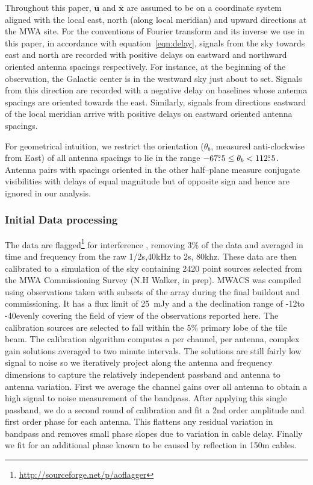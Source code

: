\documentclass[preprint2,iop,numberedappendix]{emulateapj}
\begin{document}
Throughout this paper, $\overline{\mathbf{u}}$ and $\overline{\mathbf{x}}$ are assumed to be on a coordinate system aligned with the local east, north (along local meridian) and upward directions at the MWA site. For the conventions of Fourier transform and its inverse we use in this paper, in accordance with equation~\ref{eqn:delay}, signals from the sky towards east and north are recorded with positive delays on eastward and northward oriented antenna spacings respectively. For instance, at the beginning of the observation, the Galactic center is in the westward sky just about to set. Signals from this direction are recorded with a negative delay on baselines whose antenna spacings are oriented towards the east. Similarly, signals from directions eastward of the local meridian arrive with positive delays on eastward oriented antenna spacings. 

For geometrical intuition, we restrict the orientation ($\theta_b$, measured anti-clockwise from East) of all antenna spacings to lie in the range $-67\mbox{$.\!\!^\circ$} 5 \leq \theta_b < 112\mbox{$.\!\!^\circ$} 5$. Antenna pairs with spacings oriented in the other half--plane measure conjugate visibilities with delays of equal magnitude but of opposite sign and hence are ignored in our analysis.


\subsubsection{Initial Data processing}\label{sec:data-analysis}
The data are flagged\footnote{\url{http://sourceforge.net/p/aoflagger}} for interference \citep{off12,off10}, removing 3\% of the data and averaged in time  and frequency from the raw 1/2s,40kHz to 2s, 80khz. These data are then calibrated to a simulation of the sky containing 2420 point sources selected from the MWA Commissioning Survey (N.H Walker, in prep).  MWACS was compiled using observations taken with subsets of the array during the final buildout and commissioning. It has a flux limit of 25~mJy and a the declination range of -12\arcdeg to -40\arcdeg evenly covering the field of view of the observations reported here.        The calibration sources are selected to fall within the 5\% primary lobe of the tile beam. The calibration algorithm computes a per channel, per antenna, complex gain solutions averaged to two minute intervals.  The solutions are still fairly low signal to noise so we iteratively project along the antenna and frequency dimensions to capture the relatively independent passband and antenna to antenna variation. First we average the channel gains over all antenna to obtain a high signal to noise measurement of the bandpass.  After applying this single passband, we do a second round of calibration and fit a 2nd order amplitude and first order phase for each antenna. This flattens any residual variation in bandpass and removes small phase slopes due to variation in cable delay. Finally we fit for an additional phase known to be caused by reflection in 150m cables. %
\end{document}
